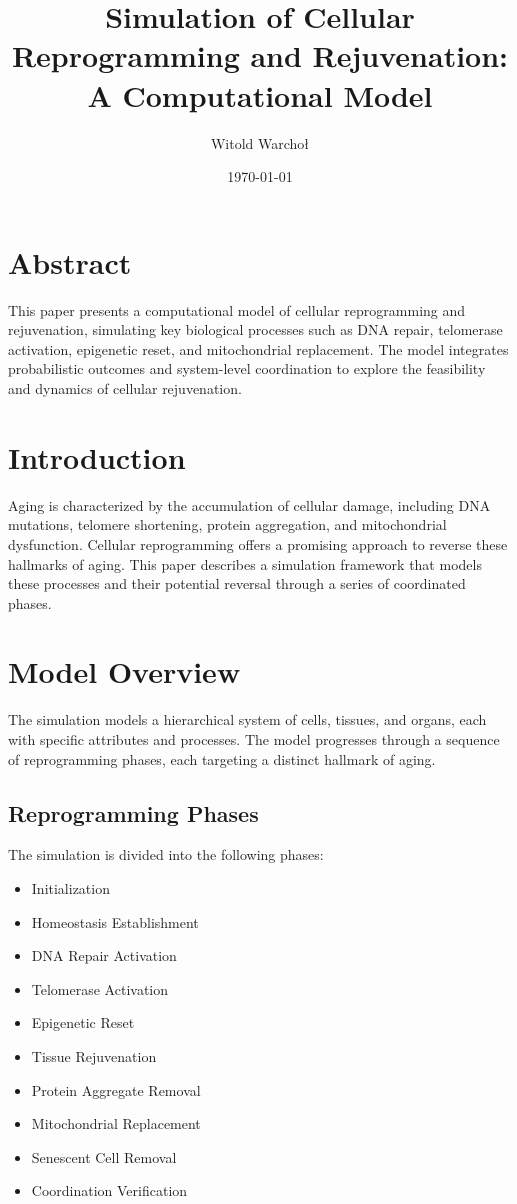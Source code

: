 \documentclass{article}
\title{Simulation of Cellular Reprogramming and Rejuvenation: A Computational Model}
\author{Witold Warchoł}
\date{\today}
\begin{document}
\maketitle

\section{Abstract}
This paper presents a computational model of cellular reprogramming and rejuvenation, simulating key biological processes such as DNA repair, telomerase activation, epigenetic reset, and mitochondrial replacement. The model integrates probabilistic outcomes and system-level coordination to explore the feasibility and dynamics of cellular rejuvenation.

\section{Introduction}
Aging is characterized by the accumulation of cellular damage, including DNA mutations, telomere shortening, protein aggregation, and mitochondrial dysfunction. Cellular reprogramming offers a promising approach to reverse these hallmarks of aging. This paper describes a simulation framework that models these processes and their potential reversal through a series of coordinated phases.

\section{Model Overview}
The simulation models a hierarchical system of cells, tissues, and organs, each with specific attributes and processes. The model progresses through a sequence of reprogramming phases, each targeting a distinct hallmark of aging.

\subsection{Reprogramming Phases}
The simulation is divided into the following phases:
\begin{itemize}
    \item Initialization
    \item Homeostasis Establishment
    \item DNA Repair Activation
    \item Telomerase Activation
    \item Epigenetic Reset
    \item Tissue Rejuvenation
    \item Protein Aggregate Removal
    \item Mitochondrial Replacement
    \item Senescent Cell Removal
    \item Coordination Verification
\end{itemize}
\end{document}
